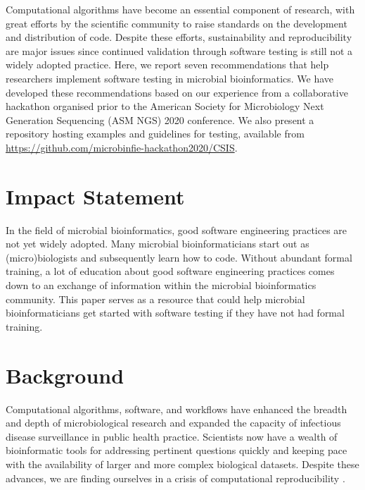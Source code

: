 Computational algorithms have become an essential component of research, with great efforts by the scientific community to raise standards on the development and distribution of code. Despite these efforts, sustainability and reproducibility are major issues since continued validation through software testing is still not a widely adopted practice. Here, we report seven recommendations that help researchers implement software testing in microbial bioinformatics. We have developed these recommendations based on our experience from a collaborative hackathon organised prior to the American Society for Microbiology Next Generation Sequencing (ASM NGS) 2020 conference. We also present a repository hosting examples and guidelines for testing, available from \url{https://github.com/microbinfie-hackathon2020/CSIS}.


\section{Impact Statement}

In the field of microbial bioinformatics, good software engineering practices are not yet widely adopted. Many microbial bioinformaticians start out as (micro)biologists and subsequently learn how to code. Without abundant formal training, a lot of education about good software engineering practices comes down to an exchange of information within the microbial bioinformatics community. This paper serves as a resource that could help microbial bioinformaticians get started with software testing if they have not had formal training.

\section{Background}

Computational algorithms, software, and workflows have enhanced the breadth and depth of microbiological research and expanded the capacity of infectious disease surveillance in public health practice. Scientists now have a wealth of bioinformatic tools for addressing pertinent questions quickly and keeping pace with the availability of larger and more complex biological datasets. Despite these advances, we are finding ourselves in a crisis of computational reproducibility \cite{stodden_empirical_2018}.

